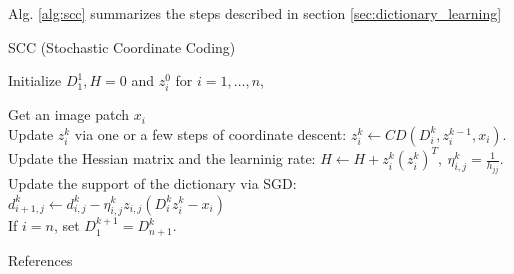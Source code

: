 \documentclass[authoryear,preprint,revi	ew,12pt]{elsarticle}
\begin{document}
Alg. \ref{alg:scc} summarizes the steps described in section \ref{sec:dictionary_learning}

\begin{algorithm}
	
	\caption{SCC (Stochastic Coordinate Coding)}\label{alg:scc}
	
	
	Initialize $ D_1^1, H = 0 $ and $ z_i^0 $ for $ i = 1,\dots,n $,
	
		{
			{Get an image patch $ x_i $\\
			Update $ z_i^k $ via one or a few steps of coordinate descent: \hspace{1.5cm}$ z_i^k \gets CD(D_i^k,z^{k-1}_i,x_i)$.\\
			Update the Hessian matrix and the learninig rate:
			\hspace{1.5cm}$ H \gets H + z^k_i(z^k_i)^T, ~\eta^k_{i,j} = \frac{1}{h_{jj}} $.\\
			Update the support of the dictionary via SGD:
			\hspace{1.5cm}$ d^k_{i+1,j} \gets d^k_{i,j} - \eta^k_{i,j}z_{i,j}(D_i^kz^k_i - x_i) $\\
			If $ i = n $, set $ D_1^{k+1} = D^k_{n+1} $.
		}
		}
	
\end{algorithm}

\newpage

\begin{center}
{\large References}
\end{center}



\end{document}
